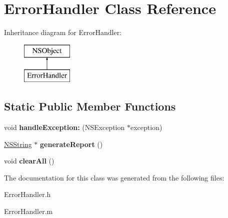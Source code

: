 \hypertarget{interface_error_handler}{
\section{\-Error\-Handler \-Class \-Reference}
\label{interface_error_handler}
}
\-Inheritance diagram for \-Error\-Handler\-:\begin{figure}[H]
\begin{center}
\leavevmode
\includegraphics[height=2.000000cm]{interface_error_handler}
\end{center}
\end{figure}
\subsection*{\-Static \-Public \-Member \-Functions}
\begin{DoxyCompactItemize}
\item 
\hypertarget{interface_error_handler_a2824725ef2ae3e2020a767db761820c2}{
void {\bfseries handle\-Exception\-:} (\-N\-S\-Exception $\ast$exception)}
\label{interface_error_handler_a2824725ef2ae3e2020a767db761820c2}

\item 
\hypertarget{interface_error_handler_a885625bf0f580c686449cf9e93d0a3a7}{
\hyperlink{class_n_s_string}{\-N\-S\-String} $\ast$ {\bfseries generate\-Report} ()}
\label{interface_error_handler_a885625bf0f580c686449cf9e93d0a3a7}

\item 
\hypertarget{interface_error_handler_ad9bf00bc45f36bf2a09ae9f2fcd393a3}{
void {\bfseries clear\-All} ()}
\label{interface_error_handler_ad9bf00bc45f36bf2a09ae9f2fcd393a3}

\end{DoxyCompactItemize}


\-The documentation for this class was generated from the following files\-:\begin{DoxyCompactItemize}
\item 
\-Error\-Handler.\-h\item 
\-Error\-Handler.\-m\end{DoxyCompactItemize}
